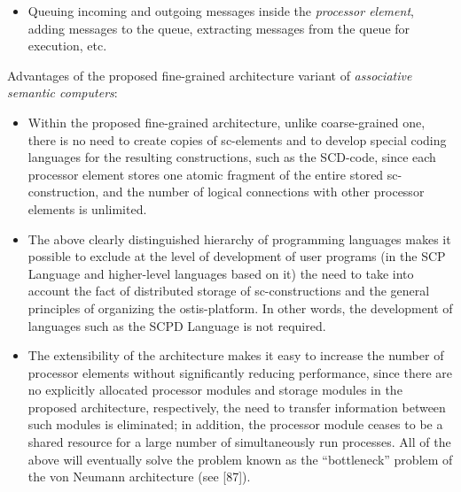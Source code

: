 \documentclass{article}
\begin{document}
\begin{multicols}{2}
\begin{itemize}
\begin{itemize}
			\item Queuing incoming and outgoing messages inside the \textit{processor element}, adding messages to the queue, extracting messages from the queue for execution, etc.
		\end{itemize}
	\end{itemize}
	
	Advantages of the proposed fine-grained architecture variant of \textit{associative semantic computers}:
	
	\begin{itemize}
		\item Within the proposed fine-grained architecture, unlike coarse-grained one, there is no need to create copies of sc-elements and to develop special coding languages for the resulting constructions, such as the SCD-code, since each processor element stores one atomic fragment of the entire stored sc-construction, and the number of logical connections with other processor elements is unlimited.
		
		\item The above clearly distinguished hierarchy of programming languages makes it possible to exclude at the level of development of user programs (in the SCP Language and higher-level languages based on it) the need to take into account the fact of distributed storage of sc-constructions and the general principles of organizing the ostis-platform. In other words, the development of languages such as the SCPD Language is not required.
		
		\item The extensibility of the architecture makes it easy to increase the number of processor elements without significantly reducing performance, since there are no explicitly allocated processor modules and storage modules in the proposed architecture, respectively, the need to transfer information between such modules is eliminated; in addition, the processor module ceases to be a shared resource for a large number of simultaneously run processes. All of the above will eventually solve the problem known as the “bottleneck” problem of the von Neumann architecture (see [87]).
		

\end{itemize}
\end{multicols}
\end{document}
